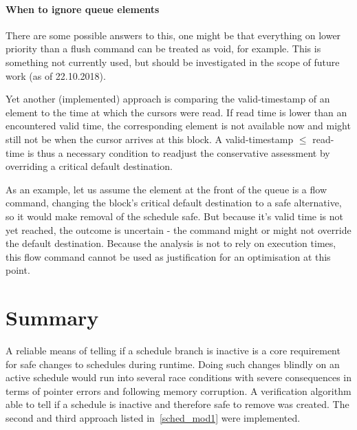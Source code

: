 \paragraph{When to ignore queue elements}
There are some possible answers to this, one might be that everything on lower priority than a flush command can be treated as void, for example. This is something not currently used, but should be investigated in the scope of future work (as of 22.10.2018).
\par
Yet another (implemented) approach is comparing the valid-timestamp of an element to the time at which the cursors were read.
If read time is lower than an encountered valid time, the corresponding element is not available now and might still not be when the cursor arrives at this block.
A valid-timestamp $\le$ read-time is thus a necessary condition to readjust the conservative assessment by overriding a critical default destination.
\par
As an example, let us assume the element at the front of the queue is a flow command, changing the block's critical default destination to a safe alternative, so it would make removal of the schedule safe.
But because it's valid time is not yet reached, the outcome is uncertain - the command might or might not override the default destination. Because the analysis is not to rely on execution times, this flow command cannot be used as justification for an optimisation at this point.


\section{Summary}
A reliable means of telling if a schedule branch is inactive is a core requirement for safe changes to schedules during runtime. Doing such changes blindly on an active schedule would run into several race conditions with severe consequences in terms of pointer errors and following memory corruption. A verification algorithm able to tell if a schedule is inactive and therefore safe to remove was created. The second and third approach listed in~\ref{sched_mod1} were implemented. 
